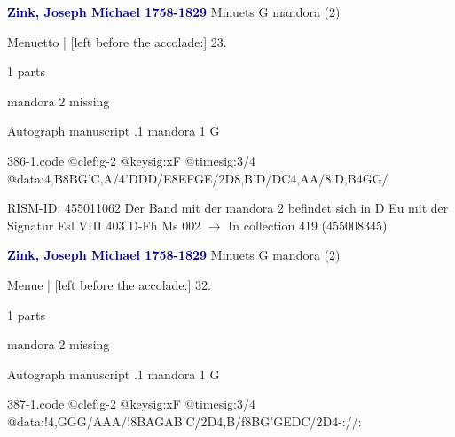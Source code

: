 \documentclass[twocolumn]{book}
\begin{document}
\newline \par \vspace{7pt} \textcolor{darkblue}{\textbf{Zink, Joseph Michael  1758-1829}}
\newline Minuets  G  
\newline mandora (2)
\newline \begin{itshape}[f.15v, at left:] Menuetto | [left before the accolade:] 23.\end{itshape} 
\newline \textcolor{darkblue}{}  1 parts  
\newline \begin{small} mandora 2 missing\end{small} 
\newline Autograph manuscript
.1  mandora 1  G  
\begin{filecontents*}{386-1.code}
@clef:g-2
@keysig:xF
@timesig:3/4
@data:4,B8BG'C,A/4'DDD/E8EFGE/2D{8,B'D}/{DC}4,AA/8'D,B4GG/
\end{filecontents*}
\newline
%

\newline RISM-ID: 455011062
\newline Der Band mit der mandora 2 befindet sich in D Eu mit der Signatur Esl VIII 403
\newline D-Fh  Ms 002
\newline $\rightarrow$ In collection 419 (455008345)

\newline \par \vspace{7pt} \textcolor{darkblue}{\textbf{Zink, Joseph Michael  1758-1829}}
\newline Minuets  G  
\newline mandora (2)
\newline \begin{itshape}[f.19r, at left:] Menue | [left before the accolade:] 32.\end{itshape} 
\newline \textcolor{darkblue}{}  1 parts  
\newline \begin{small} mandora 2 missing\end{small} 
\newline Autograph manuscript
.1  mandora 1  G  
\begin{filecontents*}{387-1.code}
@clef:g-2
@keysig:xF
@timesig:3/4
@data:!4,GGG/AAA/!8BAGAB'C/2D4,B/f8BG'GEDC/2D4-://:
\end{filecontents*}
\newline
%
\end{document}
